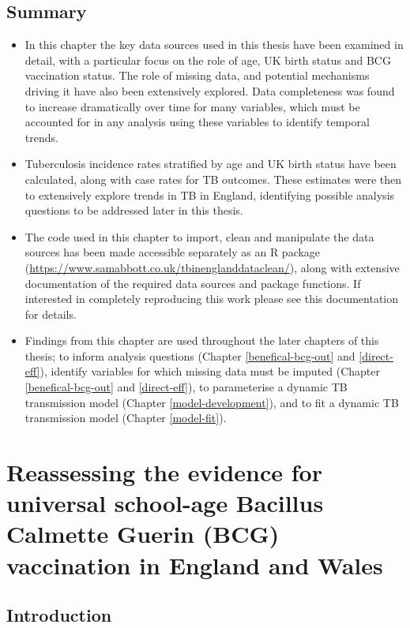 \documentclass[11pt,twoside]{bristolthesis}
\begin{document}
  \hypertarget{summary-3}{%
  \section{Summary}\label{summary-3}}
  \begin{itemize}
  \item
    In this chapter the key data sources used in this thesis have been examined in detail, with a particular focus on the role of age, UK birth status and BCG vaccination status. The role of missing data, and potential mechanisms driving it have also been extensively explored. Data completeness was found to increase dramatically over time for many variables, which must be accounted for in any analysis using these variables to identify temporal trends.
  \item
    Tuberculosis incidence rates stratified by age and UK birth status have been calculated, along with case rates for TB outcomes. These estimates were then to extensively explore trends in TB in England, identifying possible analysis questions to be addressed later in this thesis.
  \item
    The code used in this chapter to import, clean and manipulate the data sources has been made accessible separately as an R package (\url{https://www.samabbott.co.uk/tbinenglanddataclean/}), along with extensive documentation of the required data sources and package functions. If interested in completely reproducing this work please see this documentation for details.
  \item
    Findings from this chapter are used throughout the later chapters of this thesis; to inform analysis questions (Chapter \ref{benefical-bcg-out} and \ref{direct-eff}), identify variables for which missing data must be imputed (Chapter \ref{benefical-bcg-out} and \ref{direct-eff}), to parameterise a dynamic TB transmission model (Chapter \ref{model-development}), and to fit a dynamic TB transmission model (Chapter \ref{model-fit}).
  \end{itemize}
  \hypertarget{sutherland}{%
  \chapter{Reassessing the evidence for universal school-age Bacillus Calmette Guerin (BCG) vaccination in England and Wales}\label{sutherland}}
  
  \hypertarget{introduction-3}{%
  \section{Introduction}\label{introduction-3}}
  
\end{document}
